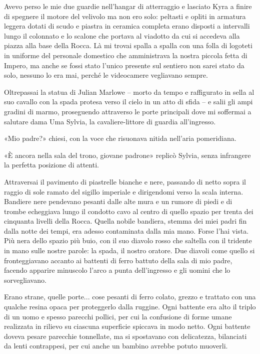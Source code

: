 Avevo perso le mie due guardie nell'hangar di atterraggio e {lasciato}
Kyra a finire di spegnere il motore del velivolo ma non ero solo:
peltasti e opliti in armatura leggera dotati di scudo e piastra in
ceramica completa erano disposti a intervalli lungo il colonnato e lo
scalone che portava al viadotto da cui si accedeva alla piazza alla base
della Rocca. Là mi trovai spalla a spalla con una folla di logoteti in
uniforme del personale domestico che amministrava la nostra piccola
fetta di Impero, ma anche se fossi stato l'unico presente sul sentiero
non sarei stato da solo, nessuno lo era mai, perché le videocamere
vegliavano sempre.

Oltrepassai la statua di Julian Marlowe -- morto da tempo e raffigurato
in sella al suo cavallo con la spada protesa verso il cielo in un atto
di sfida -- e salii gli ampi gradini di marmo, proseguendo attraverso le
porte principali dove mi soffermai a salutare dama Uma Sylvia, la
cavaliere-littore di guardia all'ingresso.

«Mio padre?» chiesi, con la voce che risuonava nitida nell'aria
pomeridiana.

«È ancora nella sala del trono, giovane padrone» replicò Sylvia, senza
infrangere la perfetta posizione di attenti.

Attraversai il pavimento di piastrelle bianche e nere, passando di netto
sopra il raggio di sole ramato del sigillo imperiale e dirigendomi verso
la scala interna. Bandiere nere pendevano pesanti dalle alte mura e un
rumore di piedi e di trombe echeggiava lungo il condotto cavo al centro
di quello spazio per trenta dei cinquanta livelli della Rocca. Quella
nobile bandiera, stemma dei miei padri fin dalla notte dei tempi, era
adesso contaminata dalla mia mano. Forse l'hai vista. Più nera dello
spazio più buio, con il suo diavolo rosso che saltella con il tridente
in mano sulle nostre parole: \foreignlanguage{italian}{la spada, il
	nostro oratore.} Due diavoli come quello si fronteggiavano accanto ai
battenti di ferro battuto della sala di mio padre, facendo apparire
minuscolo l'arco a punta dell'ingresso e gli uomini che lo
sorvegliavano.

Erano strane, quelle porte... cose pesanti di ferro colato, grezzo e
trattato con una qualche resina opaca per proteggerlo dalla ruggine.
Ogni battente era alto il triplo di un uomo e spesso parecchi pollici,
per cui la confusione di forme umane realizzata in rilievo su ciascuna
superficie spiccava in modo netto. Ogni battente doveva pesare parecchie
tonnellate, ma si spostavano con delicatezza, bilanciati da lenti
contrappesi, per cui anche un bambino avrebbe potuto muoverli.

